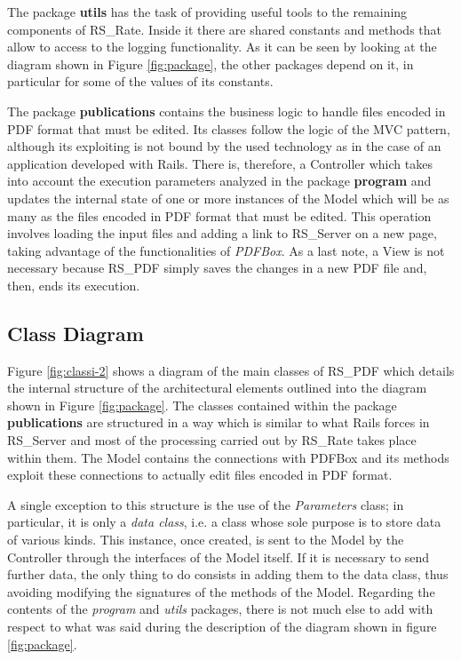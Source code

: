 \documentclass[a4paper, english]{article}
\begin{document}
The package \textbf{utils} has the task of providing useful tools to the remaining components of RS\_Rate. Inside it there are shared constants and methods that allow to access to the logging functionality. As it can be seen by looking at the diagram shown in Figure \ref{fig:package}, the other packages depend on it, in particular for some of the values of its constants.

The package \textbf{publications} contains the business logic to handle files encoded in PDF format that must be edited. Its classes follow the logic of the MVC pattern, although its exploiting is not bound by the used technology as in the case of an application developed with Rails. There is, therefore, a Controller which takes into account the execution parameters analyzed in the package \textbf{program} and updates the internal state of one or more instances of the Model which will be as many as the files encoded in PDF format that must be edited. This operation involves loading the input files and adding a link to RS\_Server on a new page, taking advantage of the functionalities of \emph{PDFBox}. As a last note, a View is not necessary because RS\_PDF simply saves the changes in a new PDF file and, then, ends its execution.

\subsection{Class Diagram}

Figure \ref{fig:classi-2} shows a diagram of the main classes of RS\_PDF which details the internal structure of the architectural elements outlined into the diagram shown in Figure \ref{fig:package}. The classes contained within the package \textbf{publications} are structured in a way which is similar to what Rails forces in RS\_Server and most of the processing carried out by RS\_Rate takes place within them. The Model contains the connections with PDFBox and its methods exploit these connections to actually edit files encoded in PDF format. 

A single exception to this structure is the use of the \emph{Parameters} class; in particular, it is only a \emph{data class}, i.e. a class whose sole purpose is to store data of various kinds. This instance, once created, is sent to the Model by the Controller through the interfaces of the Model itself. If it is necessary to send further data, the only thing to do consists in adding them to the data class, thus avoiding modifying the signatures of the methods of the Model. Regarding the contents of the \emph{program} and \emph{utils} packages, there is not much else to add with respect to what was said during the description of the diagram shown in figure \ref{fig:package}.
\end{document}
